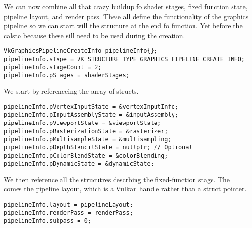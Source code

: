 \par We can now combine all that crazy buildup fo shader stages, fixed function state, pipeline layout, and render pass. These all define the functionality of the graphics pipeline so we can start will the  structure at the end fo  function. Yet before the calsto  because these sill need to be used during the creation.

\begin{center}
\begin{minipage}{0.95\linewidth}
\begin{lstlisting}
VkGraphicsPipelineCreateInfo pipelineInfo{};
pipelineInfo.sType = VK_STRUCTURE_TYPE_GRAPHICS_PIPELINE_CREATE_INFO;
pipelineInfo.stageCount = 2;
pipelineInfo.pStages = shaderStages;
\end{lstlisting}
\end{minipage}
\end{center}

\par We start by referenceing the array of  structs.

\begin{center}
\begin{minipage}{0.95\linewidth}
\begin{lstlisting}
pipelineInfo.pVertexInputState = &vertexInputInfo;
pipelineInfo.pInputAssemblyState = &inputAssembly;
pipelineInfo.pViewportState = &viewportState;
pipelineInfo.pRasterizationState = &rasterizer;
pipelineInfo.pMultisampleState = &multisampling;
pipelineInfo.pDepthStencilState = nullptr; // Optional
pipelineInfo.pColorBlendState = &colorBlending;
pipelineInfo.pDynamicState = &dynamicState;
\end{lstlisting}
\end{minipage}
\end{center}

\par We then reference all the strucutres descrbing the fixed-function stage. The comes the pipeline layout, which is a Vulkan handle rather than a struct pointer.

\begin{center}
\begin{minipage}{0.95\linewidth}
\begin{lstlisting}
pipelineInfo.layout = pipelineLayout;
pipelineInfo.renderPass = renderPass;
pipelineInfo.subpass = 0;
\end{lstlisting}
\end{minipage}
\end{center}

